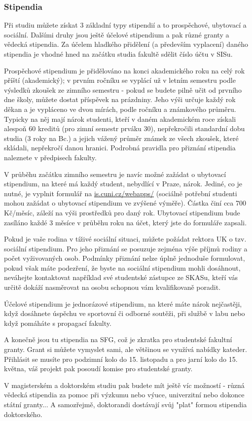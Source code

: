 \subsubsection{Stipendia}
Při studiu můžete získat 3 základní typy stipendií a to prospěchové, ubytovací a
sociální. Dalšími druhy jsou ještě účelové stipendium a pak různé granty a
vědecká stipendia. Za účelem hladkého přidělení (a především vyplacení) daného
stipendia je vhodné hned na začátku studia fakultě sdělit číslo účtu v SISu.

Prospěchové stipendium je přidělováno na konci akademického roku na celý rok
příští (akademický); v prvním ročníku se vyplácí už v letním semestru podle
výsledků zkoušek ze zimního semestru - pokud se budete pilně učit od prvního dne
školy, můžete dostat příspěvek na prázdniny. Jeho výši určuje každý rok děkan a
je vypláceno ve dvou mírách, podle ročníku a známkového průměru. Typicky na něj
mají nárok studenti, kteří v daném akademickém roce získali alespoň 60 kreditů
(pro zimní semestr prváku 30), nepřekročili standardní dobu studia (3 roky na
Bc.) a jejich vážený průměr známek ze všech zkoušek, které skládali, nepřekročí
danou hranici. Podrobná pravidla pro přiznání stipendia naleznete v předpisech
fakulty.

V průběhu začátku zimního semestru je navíc možné zažádat o ubytovací
stipendium, na které má každý student, nebydlící v Praze, nárok. Jediné, co je nutné, je vyplnit
formulář na \url{is.cuni.cz/webapps/} (sociálně potřební studenti mohou
zažádat o ubytovací stipendium ve zvýšené výměře). Částka činí cca 700 Kč/měsíc, záleží na výši
prostředků pro daný rok. Ubytovací stipendium bude zasíláno každé 3 měsíce v
průběhu roku na účet, který jste do formuláře zapsali.

Pokud je vaše rodina v tíživé sociální situaci, můžete požádat rektora UK o tzv.
sociální stipendium. Pro jeho přiznání se posuzuje zejména výše příjmů rodiny a
počet vyživovaných osob. Podmínky přiznání nelze úplně jednoduše formulovat,
pokud však máte podezření, že byste na sociální stipendium mohli dosáhnout,
neváhejte kontaktovat například své studentské zástupce ze SKASu, kteří vás
určitě dokáží nasměrovat na osobu schopnou vám kvalifikovaně poradit.

Účelové stipendium je jednorázové stipendium, na které máte nárok nejčastěji,
když dosáhnete úspěchu ve sportovní či odborné soutěži, při službě v labu nebo
když pomáháte s propagací fakulty.

A konečně jsou tu stipendia na SFG, což je zkratka pro studentské fakultní granty. Grant si můžete vymyslet sami, ale většinou se využívá nabídky kateder.
Přihlásit se musíte pro podzimní kolo do 15. listopadu a pro jarní kolo do 15. května, váš projekt pak posoudí komise pro studentské granty.

V magisterském a doktorském studiu pak budete mít ještě víc možností - různá
vědecká stipendia za pomoc při výzkumu nebo výuce, univerzitní nebo dokonce
státní granty... A samozřejmě, doktorandi dostávají svůj "plat" formou stipendia
doktorského.